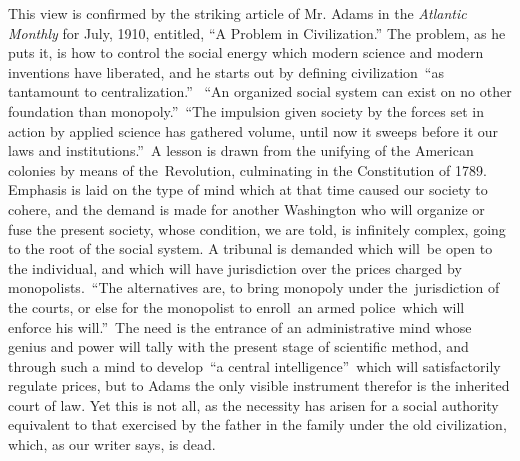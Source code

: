 \documentclass[twoside,symmetric,nobib,justified]{tufte-book}
\begin{document}
This view is confirmed by the striking article of Mr. Adams in the
\emph{Atlantic Monthly} for July, 1910, entitled, ``A Problem in
Civilization.'' The problem, as he puts it, is how to control the social
energy which modern science and modern inventions have liberated, and he
starts out by defining civilization~``as tantamount to centralization.''
~``An organized social system can exist on no other foundation than
monopoly.''~``The impulsion given society by the forces set in action by
applied science has gathered volume, until now it sweeps before it our
laws and institutions.''~A lesson is drawn from the unifying of the
American colonies by means of the~Revolution, culminating in the
Constitution of 1789. Emphasis is laid on the type of mind which at that
time caused our society to cohere, and the demand is made for another
Washington who will organize or fuse the present society, whose
condition, we are told, is infinitely complex, going to the root of the
social system. A tribunal is demanded which will~be open to the
individual, and which will have jurisdiction over the prices charged by
monopolists.~``The alternatives are, to bring monopoly under
the~jurisdiction of the courts, or else for the monopolist to enroll~an
armed police~which will enforce his will.''~The need is the entrance of
an administrative mind whose genius and power will tally with the
present stage of scientific method, and through such a mind to
develop~``a central intelligence''~which will satisfactorily regulate
prices, but to Adams the only visible instrument therefor is the
inherited court of law. Yet this is not all, as the necessity has arisen
for a social authority equivalent to that exercised by the father in the
family under the old civilization, which, as our writer says, is dead.~
\end{document}
